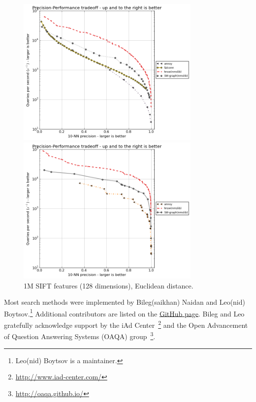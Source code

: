 \documentclass[runningheads,a4paper]{llncs}
\begin{document}
{\begin{figure}[!htb]
\centering
\caption{\label{FigGlove}1.19M vectors from GloVe (100 dimensions, trained from tweets), cosine similarity.}
\includegraphics[width=0.8\textwidth]{figures/glove.png}
\centering
\caption{\label{FigSIFT}1M SIFT features (128 dimensions), Euclidean distance.}
\includegraphics[width=0.8\textwidth]{figures/sift.png}
\end{figure}


Most search methods were implemented by Bileg(saikhan) Naidan and Leo(nid) Boytsov.\footnote{Leo(nid) Boytsov is a maintainer.}
Additional contributors are listed on the \href{https://github.com/searchivarius/NonMetricSpaceLib}{GitHub 
page}.
Bileg and Leo gratefully acknowledge support by the iAd Center~\footnote{\url{http://www.iad-center.com/}}
and the Open Advancement of Question Answering Systems (OAQA) group~\footnote{\url{http://oaqa.github.io/}}.

}
\end{document}

